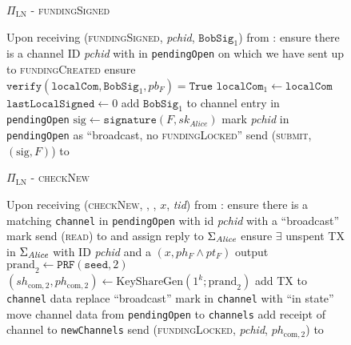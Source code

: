 \begin{figure}[H]
  \begin{protocolbox}{$\Pi_{\mathrm{LN}}$ - \textsc{fundingSigned}}
    \begin{algorithmic}[1]
      \State Upon receiving (\textsc{fundingSigned}, \textit{pchid},
      $\mathtt{BobSig}_1$) from \bob:
      \Indent
        \State ensure there is a channel ID \textit{pchid} with \bob{} in
        \texttt{pendingOpen} on which we have sent up to \textsc{fundingCreated}
        \State ensure $\mathtt{verify}\left(\mathtt{localCom},
        \mathtt{BobSig}_1, pb_F\right) = \mathtt{True}$
        \State $\mathtt{localCom}_1 \gets \mathtt{localCom}$
        \State $\mathtt{lastLocalSigned} \gets 0$
        \State add $\mathtt{BobSig}_1$ to channel entry in \texttt{pendingOpen}
        \State $\mathrm{sig} \gets \mathtt{signature}\left(F,
        sk_{\mathit{Alice}}\right)$
        \State mark \textit{pchid} in \texttt{pendingOpen} as ``broadcast, no
        \textsc{fundingLocked}''
        \State send (\textsc{submit}, $\left(\mathrm{sig}, F\right)$) to \ledger
      \EndIndent
    \end{algorithmic}
  \end{protocolbox}
  \caption{}
  \label{alg:protocol:open:fundingSigned}
\end{figure}

\begin{figure}[H]
  \begin{protocolbox}{$\Pi_{\mathrm{LN}}$ - \textsc{checkNew}}
    \begin{algorithmic}[1]
      \State {}
      \State Upon receiving (\textsc{checkNew}, \alice, \bob, $x$, \textit{tid})
      from \environment: 
      \Indent
        \State ensure there is a matching \texttt{channel} in
        \texttt{pendingOpen} with id \textit{pchid} with a ``broadcast'' mark
        \State send (\textsc{read}) to \ledger{} and assign reply to
        $\Sigma_{\mathit{Alice}}$
        \State ensure $\exists$ unspent TX in $\Sigma_{\mathit{Alice}}$ with ID
        \textit{pchid} and a $\left(x, ph_F \wedge pt_F\right)$ output
        \State $\mathrm{prand}_2 \gets \texttt{PRF}\left(\mathtt{seed},
        2\right)$
        \State $\left(sh_{\mathrm{com}, 2}, ph_{\mathrm{com}, 2}\right) \gets
        \mathrm{KeyShareGen}\left(1^k; \mathrm{prand}_2\right)$
        \State add TX to \texttt{channel} data \State replace ``broadcast'' mark
        in \texttt{channel} with ``in state''
          \State move channel data from \texttt{pendingOpen} to
          \texttt{channels}
          \State add receipt of channel to \texttt{newChannels}
        \EndIf
        \State send (\textsc{fundingLocked}, \textit{pchid}, $ph_{\mathrm{com},
        2}$) to \bob{}
      \EndIndent
    \end{algorithmic}
  \end{protocolbox}
  \caption{}
  \label{alg:protocol:open:checkNew}
\end{figure}

